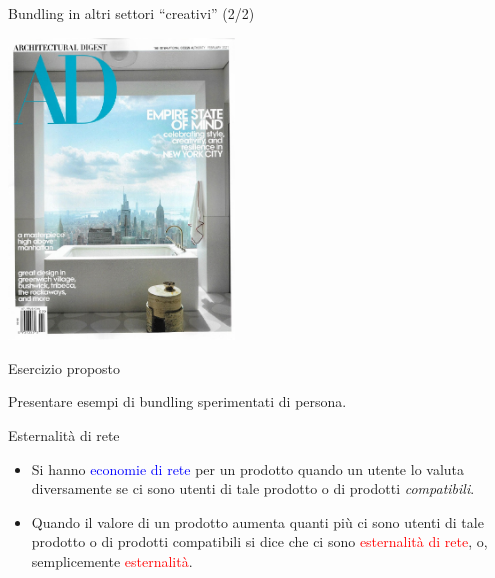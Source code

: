 \documentclass{beamer}
\begin{document}
\begin{frame}
{\centerline{Bundling in altri settori ``creativi'' (2/2)}}
\begin{center}
    \includegraphics[width=0.45\textwidth]{P2023.AIBCCSS.IlConcettoDiSoftware/BundlingAD.pdf}
\end{center}

\end{frame}

\begin{frame}
{\centerline{Esercizio proposto}}
\vspace{1cm}
\begin{center}
    \LARGE{Presentare esempi di bundling sperimentati di persona.}
\end{center}

\end{frame}



\begin{frame}
{\centerline{Esternalit\`{a} di rete}}

\begin{itemize}
\item Si hanno \textcolor{blue}{economie di rete} per un prodotto quando un utente lo valuta  diversamente se ci sono utenti di tale prodotto o di prodotti \textit{compatibili}.

\item Quando il valore di un prodotto aumenta quanti pi\`{u} ci sono utenti di tale prodotto o di prodotti compatibili si dice che ci sono \textcolor{red}{esternalit\`{a} di rete}, o, semplicemente \textcolor{red}{esternalit\`{a}}.


\end{itemize}

\end{frame}
\end{document}
